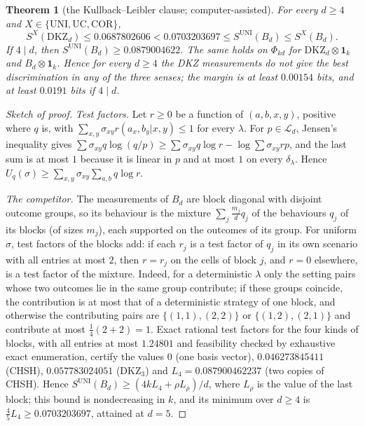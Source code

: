 \documentclass[11pt]{amsart}
\newtheorem{theorem}{Theorem}[section]
\theoremstyle{definition}
\theoremstyle{remark}
\numberwithin{equation}{section}
\newcommand{\one}{\mathbf{1}}
\newcommand{\cL}{\mathcal{L}}
\newcommand{\DKZ}{\mathrm{DKZ}}
\begin{document}
\begin{theorem}[the Kullback--Leibler clause; computer-assisted]\label{thm:kl}
For every $d\ge4$ and $X\in\{\mathrm{UNI},\mathrm{UC},\mathrm{COR}\}$,
\[
S^X(\DKZ_d)\le0.0687802606<0.0703203697\le S^{\mathrm{UNI}}(B_d)\le S^X(B_d).
\]
If $4\mid d$, then $S^{\mathrm{UNI}}(B_d)\ge0.0879004622$. The same holds on $\Phi_{kd}$ for $\DKZ_d\otimes\one_k$ and
$B_d\otimes\one_k$. Hence for every $d\ge4$ the DKZ measurements do not give the best discrimination in any of the
three senses; the margin is at least $0.00154$ bits, and at least $0.0191$ bits if $4\mid d$.
\end{theorem}

\begin{proof}[Sketch of proof]
\emph{Test factors.} Let $r\ge0$ be a function of $(a,b,x,y)$, positive where $q$ is, with
$\sum_{x,y}\sigma_{xy}r(a_x,b_y|x,y)\le1$ for every $\lambda$. For $p\in\cL_d$, Jensen's inequality gives
$\sum\sigma_{xy}q\log(q/p)\ge\sum\sigma_{xy}q\log r-\log\sum\sigma_{xy}rp$, and the last sum is at most $1$ because it is
linear in $p$ and at most $1$ on every $\delta_\lambda$. Hence $U_q(\sigma)\ge\sum_{x,y}\sigma_{xy}\sum_{a,b}q\log r$.

\emph{The competitor.} The measurements of $B_d$ are block diagonal with disjoint outcome groups, so its behaviour is
the mixture $\sum_j\frac{m_j}dq_j$ of the behaviours $q_j$ of its blocks (of sizes $m_j$), each supported on the outcomes
of its group. For uniform $\sigma$, test factors of the blocks add: if each $r_j$ is a test factor of $q_j$ in its own
scenario with all entries at most $2$, then $r=r_j$ on the cells of block $j$, and $r=0$ elsewhere, is a test factor of
the mixture. Indeed, for a deterministic $\lambda$ only the setting pairs whose two outcomes lie in the same group
contribute; if these groups coincide, the contribution is at most that of a deterministic strategy of one block, and
otherwise the contributing pairs are $\{(1,1),(2,2)\}$ or $\{(1,2),(2,1)\}$ and contribute at most $\frac14(2+2)=1$.
Exact rational test factors for the four kinds of blocks, with all entries at most $1.24801$ and feasibility checked by
exhaustive exact enumeration, certify the values $0$ (one basis vector), $0.046273845411$ (CHSH), $0.057783024051$
($\DKZ_3$) and $L_4=0.087900462237$ (two copies of CHSH). Hence $S^{\mathrm{UNI}}(B_d)\ge(4kL_4+\rho L_\rho)/d$, where
$L_\rho$ is the value of the last block; this bound is nondecreasing in $k$, and its minimum over $d\ge4$ is
$\frac45L_4\ge0.0703203697$, attained at $d=5$.


\end{proof}
\end{document}
